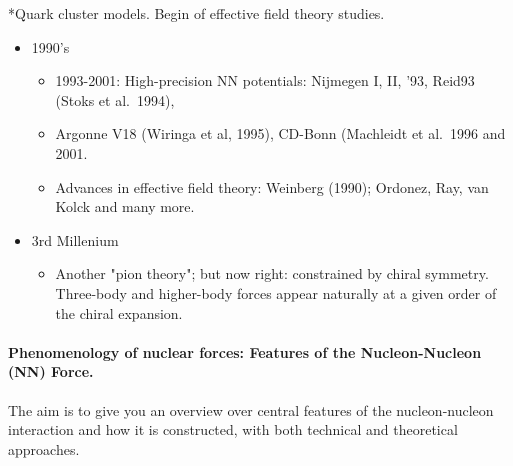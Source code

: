 \documentclass[%
oneside,                 %
final,                   %
10pt]{article}
\begin{document}
\noindent
*Quark cluster models. Begin of effective field theory studies.

\begin{itemize}
\item 1990's
\begin{itemize}

  \item 1993-2001: High-precision NN potentials: Nijmegen I, II, '93, Reid93 (Stoks et al.~1994), 

  \item Argonne V18 (Wiringa et al, 1995), CD-Bonn (Machleidt et al.~1996 and 2001. 

  \item Advances in effective field theory: Weinberg (1990); Ordonez, Ray, van Kolck and many more.

\end{itemize}

\noindent
\item 3rd Millenium
\begin{itemize}

  \item Another "pion theory"; but now right: constrained by chiral symmetry. Three-body and higher-body forces appear naturally at a given order of the chiral expansion. 
\end{itemize}

\noindent
\end{itemize}

\noindent
\paragraph{Phenomenology of nuclear forces: Features of the Nucleon-Nucleon (NN) Force.}
The aim is to give you an overview over central features of the nucleon-nucleon interaction and how it is constructed, with both technical and theoretical approaches. 
\end{document}
